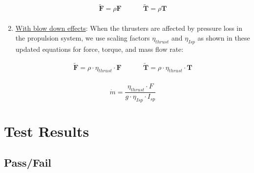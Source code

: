 \begin{enumerate}
	\begin{align}
		\tilde{\bm F} = \rho \bm F &\hspace{1cm} \tilde{\bm T} =\rho \bm T  \\
	\end{align}

	\item{\underline{With blow down effects}}: When the thrusters are affected by pressure loss in the propulsion system, we use scaling factors $\eta_{thrust}$ and $\eta_{Isp}$ as shown in these updated equations for force, torque, and mass flow rate:

	\begin{align}
		\tilde{\bm F} = \rho \cdot \eta_{thrust} \cdot \bm F &\hspace{1cm} \tilde{\bm T} =\rho \cdot \eta_{thrust} \cdot \bm T  \\
	\end{align}

	\begin{equation}
	\dot{m} = \frac{\eta_{thrust} \cdot F}{g \cdot \eta_{Isp} \cdot I_{sp}}
	\end{equation}

\end{enumerate}



\section{Test Results}

\subsection{Pass/Fail}

